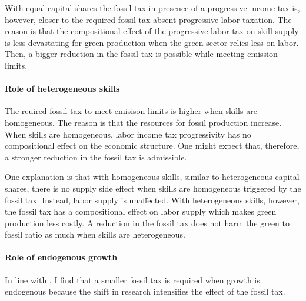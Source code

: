 With equal capital shares the fossil tax in presence of a progressive income tax is, however, closer to the required fossil tax absent progressive labor taxation.  The reason is that the compositional effect of the  progressive labor tax on skill supply is less devastating for green production when the green sector relies less on labor. Then, a bigger reduction in the fossil tax is possible while meeting emission limits. 

\paragraph{Role of heterogeneous skills}

The reuired fossil tax to meet emisison limits is higher when skills are homogeneous. The reason is that the resources for fossil production increase.
When skills are homogeneous, labor income tax progressivity has no compositional effect on the economic structure. One might expect that, therefore, a stronger reduction in the fossil tax is admissible. 

One explanation is that with homogeneous skills, similar to heterogeneous capital shares, there is no supply side effect when skills are homogeneous triggered by the fossil tax. Instead, labor supply is unaffected. With heterogeneous skills, however, the fossil tax has a compositional effect on labor supply which makes green production less costly. A reduction in the fossil tax does not harm the green to fossil ratio as much when skills are heterogeneous. 

\paragraph{Role of endogenous growth}
In line with \cite{Fried2018ClimateAnalysis}, I find that a smaller fossil tax is required when growth is endogenous because the shift in research intensifies the effect of the fossil tax.  
